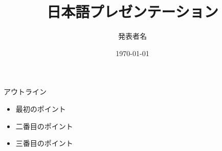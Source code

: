 \documentclass{beamer}
\title{日本語プレゼンテーション}
\author{発表者名}
\date{\today}
\begin{document}
\begin{frame}
  \titlepage
\end{frame}

\begin{frame}{アウトライン}
  \begin{itemize}
    \item 最初のポイント
    \item 二番目のポイント
    \item 三番目のポイント
  \end{itemize}
\end{frame}
\end{document}

